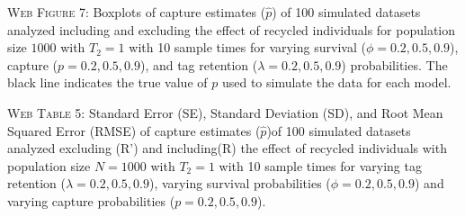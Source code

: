 \documentclass[]{article}
\begin{document}
\textsc{Web Figure 7:} Boxplots of capture estimates (\(\hat{p}\)) of
100 simulated datasets analyzed including and excluding the effect of recycled
individuals for population size \(1000\) with \(T_2=1\) with 10 sample times for varying survival (\(\phi=0.2,0.5,0.9\)), capture
(\(p=0.2,0.5,0.9\)), and tag retention (\(\lambda=0.2,0.5,0.9\))
probabilities. The black line indicates the true value of \(p\) used to
simulate the data for each model.

\textsc{Web Table 5:} Standard Error (SE), Standard Deviation (SD), and
Root Mean Squared Error (RMSE) of capture estimates (\(\hat{p}\))of 100
simulated datasets analyzed excluding (R') and including(R) the effect of
recycled individuals with population size \(N=1000\) with \(T_2=1\) with
10 sample times for varying tag retention (\(\lambda=0.2,0.5,0.9\)),
varying survival probabilities (\(\phi=0.2,0.5,0.9\)) and varying
capture probabilities (\(p=0.2,0.5,0.9\)).
\end{document}
